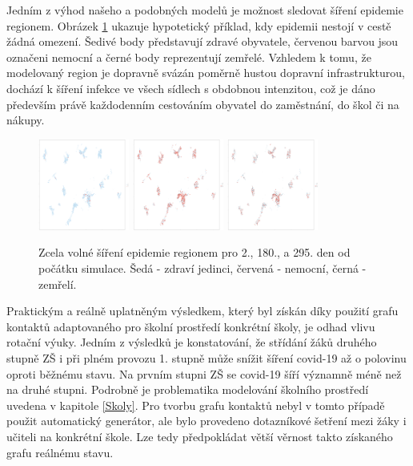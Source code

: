 Jedním z výhod našeho a podobných modelů je možnost sledovat šíření epidemie regionem. Obrázek \ref{sireniepidemie} ukazuje hypotetický příklad, kdy epidemii nestojí v cestě žádná omezení. Šedivé body představují zdravé obyvatele, červenou barvou jsou označeni nemocní a černé body reprezentují zemřelé. Vzhledem k tomu, že modelovaný region je dopravně svázán poměrně hustou dopravní infrastrukturou, dochází k šíření infekce ve všech sídlech s obdobnou intenzitou, což je dáno především právě každodenním cestováním obyvatel do zaměstnání, do škol či na nákupy.

\begin{figure}
\begin{center}
\includegraphics[width=30mm]{pic/hodo002.png}
\includegraphics[width=30mm]{pic/hodo180.png}
\includegraphics[width=30mm]{pic/hodo295.png}
\end{center}
\caption{Zcela volné šíření epidemie regionem pro 2., 180., a 295. den od počátku simulace. Šedá - zdraví jedinci, červená - nemocní, černá - zemřelí. }
\label{sireniepidemie}
\end{figure}

Praktickým a reálně uplatněným výsledkem, který byl získán díky použití grafu kontaktů adaptovaného pro školní prostředí konkrétní školy, je odhad vlivu rotační výuky. Jedním z výsledků je konstatování, že střídání žáků druhého stupně ZŠ i při plném provozu 1. stupně může snížit šíření covid-19 až o polovinu oproti běžnému stavu. Na prvním stupni ZŠ se covid-19 šíří významně méně než na druhé stupni. Podrobně je problematika modelování školního prostředí uvedena v kapitole \ref{Skoly}. Pro tvorbu grafu kontaktů nebyl v tomto případě použit automatický generátor, ale bylo provedeno dotazníkové šetření mezi žáky i učiteli na konkrétní škole. Lze tedy předpokládat větší věrnost takto získaného grafu reálnému stavu.


